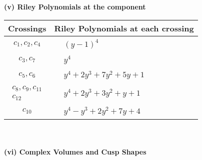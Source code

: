 \documentclass[1p]{elsarticle_modified}
\theoremstyle{definition}
\begin{document}
\newpage\renewcommand{\arraystretch}{1}
\flushleft \textbf{(v) Riley Polynomials at the component}\newline \\
\begin{tabular}{m{50pt}|m{274pt}}
Crossings & \hspace{64pt}Riley Polynomials at each crossing \\
\hline $$\begin{aligned}c_{1},c_{2},c_{4}\end{aligned}$$&$\begin{aligned}
&(y-1)^4
\end{aligned}$\\
\hline $$\begin{aligned}c_{3},c_{7}\end{aligned}$$&$\begin{aligned}
&y^4
\end{aligned}$\\
\hline $$\begin{aligned}c_{5},c_{6}\end{aligned}$$&$\begin{aligned}
&y^4+2 y^3+7 y^2+5 y+1
\end{aligned}$\\
\hline $$\begin{aligned}c_{8},c_{9},c_{11}\\c_{12}\end{aligned}$$&$\begin{aligned}
&y^4+2 y^3+3 y^2+y+1
\end{aligned}$\\
\hline $$\begin{aligned}c_{10}\end{aligned}$$&$\begin{aligned}
&y^4- y^3+2 y^2+7 y+4
\end{aligned}$\\
\hline
\end{tabular}\\~\\
\newpage\flushleft \textbf{(vi) Complex Volumes and Cusp Shapes}
\end{document}
